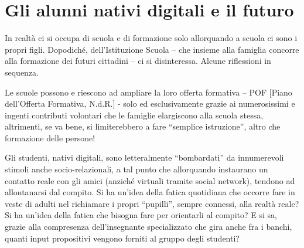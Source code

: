 \section*{Gli alunni nativi digitali e il futuro}

In realtà ci si occupa di scuola e di formazione solo allorquando a scuola ci sono i propri figli. Dopodiché, dell'Istituzione Scuola – che insieme alla famiglia concorre alla formazione dei futuri cittadini – ci si disinteressa. Alcune riflessioni in sequenza.

Le scuole possono e riescono ad ampliare la loro offerta formativa – POF [Piano dell'Offerta Formativa, N.d.R.] - solo ed esclusivamente grazie ai numerosissimi e ingenti contributi volontari che le famiglie elargiscono alla scuola stessa, altrimenti, se va bene, si limiterebbero a fare “semplice istruzione”, altro che formazione delle persone!

Gli studenti, nativi digitali, sono letteralmente “bombardati” da innumerevoli stimoli anche socio-relazionali, a tal punto che allorquando instaurano un contatto reale con gli amici (anziché virtuali tramite social network), tendono ad allontanarsi dal compito. Si ha un'idea della fatica quotidiana che occorre fare in veste di adulti nel richiamare i propri “pupilli”, sempre connessi, alla realtà reale? Si ha un'idea della fatica che bisogna fare per orientarli al compito? E si sa, grazie alla compresenza dell'insegnante specializzato che gira anche fra i banchi, quanti input propositivi vengono forniti al gruppo degli studenti?

